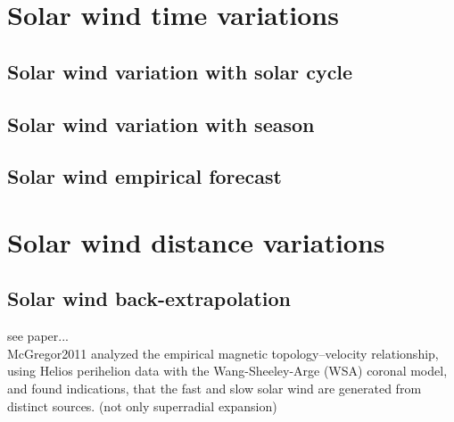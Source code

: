 \chapter{Solar wind time variations}
\section{Solar wind variation with solar cycle}
\section{Solar wind variation with season}
\section{Solar wind empirical forecast}

\chapter{Solar wind distance variations}
\section{Solar wind back-extrapolation}



see paper...\\

McGregor2011 analyzed the empirical magnetic topology–velocity relationship, using Helios perihelion data with the Wang-Sheeley-Arge (WSA) coronal model, and found indications, that the fast and slow solar wind are generated from distinct sources. (not only superradial expansion)\\

